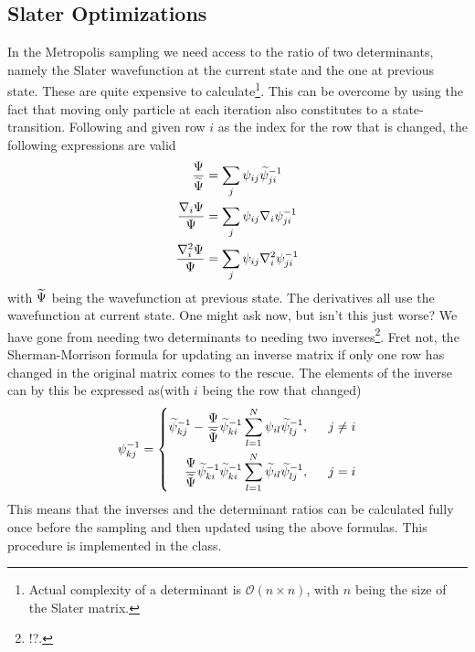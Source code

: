 \subsection{Slater Optimizations\label{susec:slateropt}}
    In the Metropolis sampling we need access to the ratio of two determinants,
    namely the Slater wavefunction at the current state and the one at previous
    state. These are quite expensive to calculate\footnote{Actual complexity of
    a determinant is $\mathcal{O}(n\times n)$, with $n$ being the size of the Slater
    matrix.}. This can be overcome by using the fact that moving only
     particle at each iteration also constitutes to a
    state-transition. Following \cite{vmc} and given row $i$ as the index for
    the row that is changed, the following expressions are valid
        \begin{equation}
            \begin{aligned}
                \frac{\Psi}{\widetilde{\Psi}} &= \sum_j \psi_{ij}
                \widetilde{\psi}_{ji}^{-1} \\
                \frac{\nabla_i \Psi}{\Psi} &= \sum_j \psi_{ij} \nabla_i
                \psi_{ji}^{-1} \\
                \frac{\nabla^2_i \Psi}{\Psi} &= \sum_j \psi_{ij} \nabla^2_i
                \psi_{ji}^{-1} \\
            \end{aligned}
        \end{equation}
    with $\widetilde{\Psi}$ being the wavefunction at previous state. The
    derivatives all use the wavefunction at current state. One might ask now,
    but isn't this just worse? We have gone from needing two determinants to
    needing two inverses\footnote{!?.}. Fret not, the Sherman-Morrison
    formula\cite{shermorInv} for updating an inverse matrix if only one row has
    changed in the original matrix comes to the rescue. The elements of the
    inverse can by this be expressed as(with $i$ being the row that changed)
        \begin{equation}
            \psi^{-1}_{kj} = \left\{\begin{aligned}
                \wtld{\psi}^{-1}_{kj} -
                \frac{\Psi}{\wtld{\Psi}}\wtld{\psi}^{-1}_{ki}
                \suml{l=1}{N}\psi_{il}\wtld{\psi}^{-1}_{lj}, \indent j \neq i
                \\
                \frac{\Psi}{\wtld{\Psi}}\wtld{\psi}^{-1}_{ki}\wtld{\psi}^{-1}_{ki}
                \suml{l=1}{N}\wtld{\psi}_{il}\wtld{\psi}^{-1}_{lj}, \indent j =
                i
            \end{aligned}\right.
        \end{equation}
    This means that the inverses and the determinant ratios can be calculated
    fully once before the sampling and then updated using the above formulas.
    This procedure is implemented in the  class.

